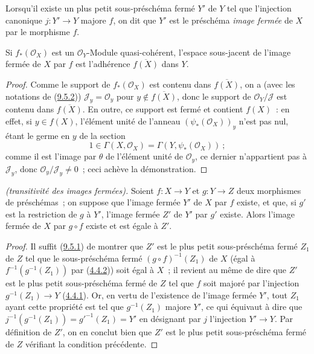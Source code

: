 \begin{definition}[9.5.3]
\label{I.9.5.3-fr}
Lorsqu'il existe un plus petit sous-préschéma fermé $Y'$ de $Y$ tel que
l'injection canonique $j:Y'\to Y$ majore $f$, on dit que $Y'$ est le
préschéma \emph{image fermée} de $X$ par le morphisme $f$.
\end{definition}

\begin{proposition}[9.5.4]
\label{I.9.5.4-fr}
Si $f_*(\mathscr{O}_X)$ est un $\mathscr{O}_Y$-Module quasi-cohérent,
l'espace sous-jacent de l'image fermée de $X$ par $f$ est l'adhérence
$\overline{f(X)}$ dans $Y$.
\end{proposition}

\begin{proof}
Comme le support de $f_*(\mathscr{O}_X)$ est contenu dans
$\overline{f(X)}$, on a (avec les notations de
(\hyperref[I.9.5.2-fr]{9.5.2})) $\mathscr{J}_y=\mathscr{O}_y$ pour
$y\notin\overline{f(X)}$, donc le support de
$\mathscr{O}_Y/\mathscr{J}$ est contenu dans $\overline{f(X)}$. En outre, ce
support est fermé et contient $f(X)$~: en effet, si $y\in f(X)$, l'élément
unité de l'anneau $(\psi_*(\mathscr{O}_X))_y$ n'est pas nul, étant le germe
en $y$ de la section
\[
  1\in\Gamma(X,\mathscr{O}_X)=\Gamma(Y,\psi_*(\mathscr{O}_X))~;
\]
comme il est l'image par $\theta$ de l'élément unité de $\mathscr{O}_y$, ce
dernier n'appartient pas à $\mathscr{J}_y$, donc
$\mathscr{O}_y/\mathscr{J}_y\neq0$~; ceci achève la démonstration.
\end{proof}

\begin{proposition}[9.5.5]
\label{I.9.5.5-fr}
\emph{(transitivité des images fermées).} Soient $f:X\to Y$ et $g:Y\to Z$
deux morphismes de préschémas~; on suppose que l'image fermée $Y'$ de $X$
par $f$ existe, et que, si $g'$ est la restriction de $g$ à $Y'$, l'image
fermée $Z'$ de $Y'$ par $g'$ existe. Alors l'image fermée de $X$ par
$g\circ f$ existe et est égale à $Z'$.
\end{proposition}

\begin{proof}
Il suffit (\hyperref[I.9.5.1-fr]{9.5.1}) de montrer que $Z'$ est le plus
petit sous-préschéma fermé $Z_1$ de $Z$ tel que le sous-préschéma fermé
$(g\circ f)^{-1}(Z_1)$ de $X$ (égal à $f^{-1}(g^{-1}(Z_1))$ par
(\hyperref[I.4.4.2-fr]{4.4.2})) soit égal à $X$~; il revient au même de dire
que $Z'$ est le plus petit sous-préschéma fermé de $Z$ tel que $f$ soit
majoré par l'injection $g^{-1}(Z_1)\to Y$
(\hyperref[I.4.4.1-fr]{4.4.1}). Or, en vertu de l'existence de l'image
fermée $Y'$, tout $Z_1$ ayant cette propriété est tel que $g^{-1}(Z_1)$
majore $Y'$, ce qui équivaut à dire que
$j^{-1}(g^{-1}(Z_1))=g'^{-1}(Z_1)=Y'$ en désignant par $j$ l'injection
$Y'\to Y$. Par définition de $Z'$, on en conclut bien que $Z'$ est le plus
petit sous-préschéma fermé de $Z$ vérifiant la condition précédente.
\end{proof}

